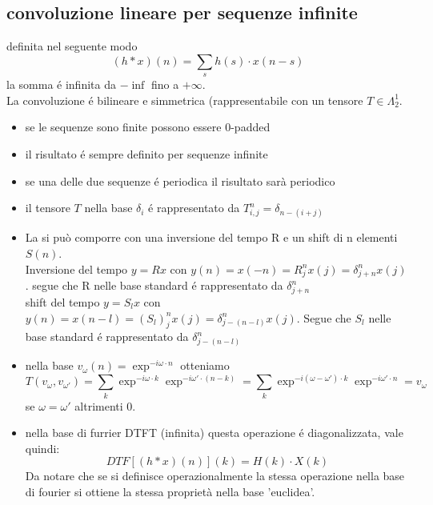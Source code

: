 \documentclass[11pt,a4paper,DIV12,BCOR1.5mm]{scrartcl}
\begin{document}
\subsection{convoluzione lineare per sequenze infinite}
definita nel seguente modo
\begin{equation}
(h\ast x)(n) = \sum_s h(s)\cdot x(n-s)
\end{equation}
la somma é infinita da $-\inf$ fino a $+\infty$.\\
La convoluzione é bilineare e simmetrica (rappresentabile con un tensore $T\in \varLambda^1_2$.
\begin{itemize}
	\item se le sequenze sono finite possono essere 0-padded
	\item il risultato é sempre definito per sequenze infinite
	\item se una delle due sequenze é periodica il risultato sarà periodico
	\item il tensore $T$ nella base $\delta_i$ é rappresentato da $T_{i,j}^n = \delta_{n-(i+j)}$
	\item  La si può comporre con una inversione del tempo R e un shift di n  elementi $S(n)$.\\
	Inversione del tempo $y = R x$ con $y(n) = x(-n) = R^n_j x(j) =  \delta ^n_{j+n} x(j)$. segue che R nelle base standard é rappresentato da $\delta ^n_{j+n}$\\
	shift del tempo $y = S_l x$ con $y(n) = x(n-l) = (S_l)^n_j x(j) =  \delta ^n_{j-(n-l)} x(j)$. Segue che $S_l$ nelle base standard é rappresentato da $\delta^n_{j-(n-l)}$
	
	\item nella base $v_\omega (n) = \exp^{-i\omega\cdot n}$ otteniamo
	\begin{equation}
	T(v_\omega,v_{\omega'}) = \sum_k \exp^{-i\omega\cdot k} \exp^{-i\omega'\cdot (n-k)} = \sum_k \exp^{-i(\omega-\omega')\cdot k} \exp^{-i\omega'\cdot n} = v_\omega 
	\end{equation} 
	se $\omega = \omega'$ altrimenti 0.
	
	\item  nella base di furrier DTFT (infinita) questa operazione é diagonalizzata, vale quindi:
	\begin{equation}
	DTF[(h\ast x)(n)](k) = H(k) \cdot X(k)
	\end{equation}
	Da notare che se si definisce operazionalmente la stessa operazione nella base di fourier si ottiene la stessa proprietà nella base 'euclidea'.
\end{itemize}
\end{document}
